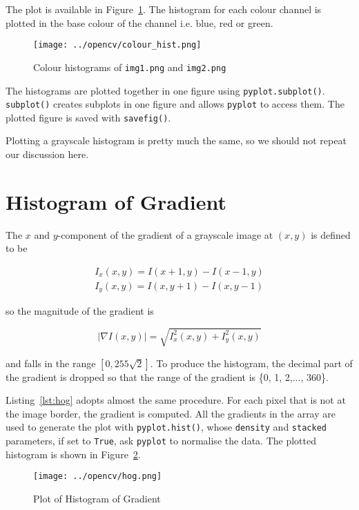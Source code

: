 \documentclass{ee208report}
\begin{document}
\begin{multicols*}{2}
The plot is available in Figure~\ref{fig:colour-histogram}. The histogram for each colour channel is plotted in the base colour of the channel i.e. blue, red or green.

\begin{figure}[H]
    \texttt{[image: ../opencv/colour\_hist.png]}
    \caption{Colour histograms of \texttt{img1.png} and \texttt{img2.png}}
    \label{fig:colour-histogram}
\end{figure}

The histograms are plotted together in one figure using \texttt{pyplot.subplot()}. \texttt{subplot()} creates subplots in one figure and allows \texttt{pyplot} to access them. The plotted figure is saved with \texttt{savefig()}.

Plotting a grayscale histogram is pretty much the same, so we should not repeat our discussion here.

\section{Histogram of Gradient}

The $x$ and $y$-component of the gradient of a grayscale image at $(x, y)$ is defined to be

\begin{align*}
    I_x(x, y) = I(x + 1, y) - I(x - 1, y)\\
    I_y(x, y) = I(x, y + 1) - I(x, y - 1)
\end{align*}

\noindent so the magnitude of the gradient is

\[
    |\nabla I(x, y)| = \sqrt{I_x^2(x, y) + I_y^2(x, y)}
\]

\noindent and falls in the range $[0, 255\sqrt{2}]$. To produce the histogram, the decimal part of the gradient is dropped so that the range of the gradient is \{0, 1, 2,..., 360\}.

Listing~\ref{lst:hog} adopts almost the same procedure. For each pixel that is not at the image border, the gradient is computed. All the gradients in the array are used to generate the plot with \texttt{pyplot.hist()}, whose \texttt{density} and \texttt{stacked} parameters, if set to \texttt{True}, ask \texttt{pyplot} to normalise the data. The plotted histogram is shown in Figure~\ref{fig:plot-hog}.

\begin{figure}[H]
    \texttt{[image: ../opencv/hog.png]}
    \caption{Plot of Histogram of Gradient}
    \label{fig:plot-hog}
\end{figure}

\end{multicols*}
\end{document}
